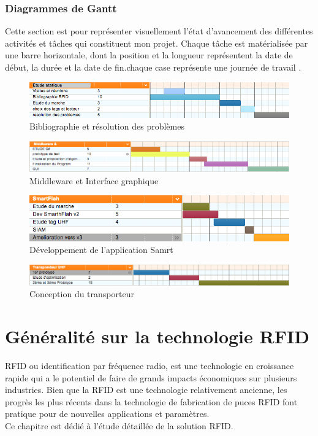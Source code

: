 \documentclass[11pt, a4paper, twoside]{book}
\begin{document}
\subsection{Diagrammes	de	Gantt}
Cette section est pour représenter visuellement l'état d'avancement des différentes activités et tâches qui constituent mon projet. Chaque tâche est matérialisée par une barre horizontale, dont la position et la longueur représentent la date de début, la durée et la date de fin.chaque case représente une journée de travail . 
\begin{figure}[H]
\centering
\includegraphics[width=\textwidth]{etudestatic}
\caption{Bibliographie et résolution des problèmes}

\end{figure}
\begin{figure}[H]
\centering
\includegraphics[width=\textwidth]{mid}
\caption{Middleware et Interface graphique}

\end{figure}
\begin{figure}[H]
\centering
\includegraphics[width=\textwidth]{smart}
\caption{Développement de l'application Samrt}

\end{figure}
\begin{figure}[H]
\centering
\includegraphics[width=\textwidth]{trans}
\caption{Conception du transporteur}

\end{figure}




\chapter{Généralité sur la technologie RFID}
RFID ou identification par fréquence radio, est une technologie en croissance rapide qui a le potentiel de faire de grands impacts économiques sur plusieurs industries. Bien que la RFID est une technologie relativement ancienne, les progrès les plus récents dans la technologie de fabrication de puces RFID font pratique pour de nouvelles applications et paramètres.\\
Ce chapitre est dédié à l'étude	 détaillée de la solution RFID.
\end{document}
